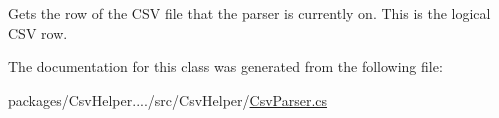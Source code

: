 Gets the row of the C\-S\-V file that the parser is currently on. This is the logical C\-S\-V row. 



The documentation for this class was generated from the following file\-:\begin{DoxyCompactItemize}
\item 
packages/\-Csv\-Helper..../src/\-Csv\-Helper/\hyperlink{a00201}{Csv\-Parser.\-cs}\end{DoxyCompactItemize}
